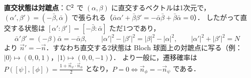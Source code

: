\textbf{直交状態は対蹠点}：$\mathbb{C}^2$ で $(\alpha,\beta)$ に直交するベクトルは1次元で，$(\alpha',\beta')=(-\bar\beta,\bar\alpha)$ で張られる（$\bar\alpha\alpha'+\bar\beta\beta'=-\bar\alpha\bar\beta+\bar\beta\bar\alpha=0$）．
したがって直交する状態は $[\alpha':\beta']=[-\bar\beta:\bar\alpha]$ ただ1つであり，
\[
  \bar\alpha'\beta'=(-\beta)\bar\alpha=-\bar\alpha\beta,\qquad |\alpha'|^2-|\beta'|^2=|\beta|^2-|\alpha|^2,\qquad |\alpha'|^2+|\beta'|^2=N
\]
より $\vec n'=-\vec n$．すなわち直交する2状態は Bloch 球面上の対蹠点に写る（例：$|0\rangle\mapsto(0,0,1)$，$|1\rangle\mapsto(0,0,-1)$）．
より一般に，遷移確率は $P([\psi],[\phi])=\frac{1+\vec n_\psi\cdot\vec n_\phi}{2}$ となり，$P=0\iff\vec n_\phi=-\vec n_\psi$ である．
